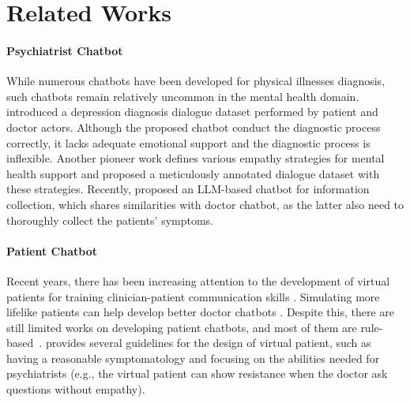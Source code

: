 \section{Related Works}

\paragraph{Psychiatrist Chatbot} While numerous chatbots have been developed for physical illnesses diagnosis\cite{Xu2019End, wei2018task}, such chatbots remain relatively uncommon in the mental health domain. \citet{yao-etal-2022-d4} introduced a depression diagnosis dialogue dataset performed by patient and doctor actors. Although the proposed chatbot conduct the diagnostic process correctly, it lacks adequate emotional support and the diagnostic process is inflexible. Another pioneer work \cite{liu2021towards} defines various empathy strategies for mental health support and proposed a meticulously annotated dialogue dataset with these strategies. Recently, \citet{wei2023leveraging} proposed an LLM-based chatbot for information collection, which shares similarities with doctor chatbot, as the latter also need to thoroughly collect the patients' symptoms. 

\paragraph{Patient Chatbot} Recent years, there has been increasing attention to the development of virtual patients for training clinician-patient communication skills \cite{Chaby2022Embodied}. Simulating more lifelike patients can help develop better doctor chatbots \cite{tseng2021transferable}. 
Despite this, there are still limited works on developing patient chatbots, and most of them are rule-based~\cite{Llanos2021Lessons}. \citet{Duppuy2020Guidelines} provides several guidelines for the design of virtual patient, such as having a reasonable symptomatology and focusing on the abilities needed for psychiatrists (e.g., the virtual patient can show resistance when the doctor ask questions without empathy).